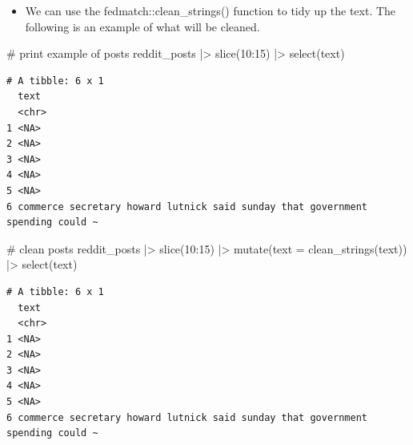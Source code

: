 \documentclass[
  letterpaper,
  DIV=11,
  numbers=noendperiod]{scrartcl}
\newenvironment{Shaded}{\begin{snugshade}}{\end{snugshade}}
\newcommand{\AttributeTok}[1]{\textcolor[rgb]{0.40,0.45,0.13}{#1}}
\newcommand{\CommentTok}[1]{\textcolor[rgb]{0.37,0.37,0.37}{#1}}
\newcommand{\DecValTok}[1]{\textcolor[rgb]{0.68,0.00,0.00}{#1}}
\newcommand{\FunctionTok}[1]{\textcolor[rgb]{0.28,0.35,0.67}{#1}}
\newcommand{\NormalTok}[1]{\textcolor[rgb]{0.00,0.23,0.31}{#1}}
\newcommand{\SpecialCharTok}[1]{\textcolor[rgb]{0.37,0.37,0.37}{#1}}
\providecommand{\tightlist}{%
  \setlength{\itemsep}{0pt}\setlength{\parskip}{0pt}}\usepackage{longtable,booktabs,array}
\begin{document}
\begin{itemize}
\tightlist
\item
  We can use the fedmatch::clean\_strings() function to tidy up the
  text. The following is an example of what will be cleaned.
\end{itemize}

\begin{Shaded}
\begin{Highlighting}[]
\CommentTok{\# print example of posts}
\NormalTok{reddit\_posts }\SpecialCharTok{|\textgreater{}} 
  \FunctionTok{slice}\NormalTok{(}\DecValTok{10}\SpecialCharTok{:}\DecValTok{15}\NormalTok{) }\SpecialCharTok{|\textgreater{}} 
  \FunctionTok{select}\NormalTok{(text) }
\end{Highlighting}
\end{Shaded}

\begin{verbatim}
# A tibble: 6 x 1
  text                                                                          
  <chr>                                                                         
1 <NA>                                                                          
2 <NA>                                                                          
3 <NA>                                                                          
4 <NA>                                                                          
5 <NA>                                                                          
6 commerce secretary howard lutnick said sunday that government spending could ~
\end{verbatim}

\begin{Shaded}
\begin{Highlighting}[]
\CommentTok{\# clean posts}
\NormalTok{reddit\_posts }\SpecialCharTok{|\textgreater{}} 
  \FunctionTok{slice}\NormalTok{(}\DecValTok{10}\SpecialCharTok{:}\DecValTok{15}\NormalTok{) }\SpecialCharTok{|\textgreater{}} 
  \FunctionTok{mutate}\NormalTok{(}\AttributeTok{text =} \FunctionTok{clean\_strings}\NormalTok{(text)) }\SpecialCharTok{|\textgreater{}} 
  \FunctionTok{select}\NormalTok{(text) }
\end{Highlighting}
\end{Shaded}

\begin{verbatim}
# A tibble: 6 x 1
  text                                                                          
  <chr>                                                                         
1 <NA>                                                                          
2 <NA>                                                                          
3 <NA>                                                                          
4 <NA>                                                                          
5 <NA>                                                                          
6 commerce secretary howard lutnick said sunday that government spending could ~
\end{verbatim}
\end{document}
